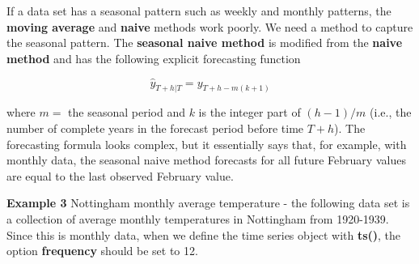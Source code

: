 \documentclass[
]{book}
\begin{document}
If a data set has a seasonal pattern such as weekly and monthly patterns, the \textbf{moving average} and \textbf{naive} methods work poorly. We need a method to capture the seasonal pattern. The \textbf{seasonal naive method} is modified from the \textbf{naive method} and has the following explicit forecasting function

\[
\hat{y}_{T+h|T} = y_{T+h-m(k+1)}
\]

where \(m =\) the seasonal period and \(k\) is the integer part of \((h-1)/m\) (i.e., the number of complete years in the forecast period before time \(T + h\)). The forecasting formula looks complex, but it essentially says that, for example, with monthly data, the seasonal naive method forecasts for all future February values are equal to the last observed February value.

\textbf{Example 3} Nottingham monthly average temperature - the following data set is a collection of average monthly temperatures in Nottingham from 1920-1939. Since this is monthly data, when we define the time series object with \textbf{ts()}, the option \textbf{frequency} should be set to 12.
\end{document}
